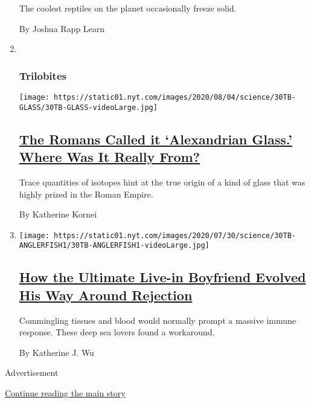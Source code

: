 \begin{enumerate}
  The coolest reptiles on the planet occasionally freeze solid.

  By Joshua Rapp Learn
\item ~
  \hypertarget{trilobites-2}{%
  \subsubsection{Trilobites}\label{trilobites-2}}

  \texttt{[image: https://static01.nyt.com/images/2020/08/04/science/30TB-GLASS/30TB-GLASS-videoLarge.jpg]}

  \hypertarget{the-romans-called-it-alexandrian-glass-where-was-it-really-from}{%
  \subsection{\texorpdfstring{\href{/2020/07/31/science/alexandrian-glass-rome.html}{The
  Romans Called it `Alexandrian Glass.' Where Was It Really
  From?}}{The Romans Called it `Alexandrian Glass.' Where Was It Really From?}}\label{the-romans-called-it-alexandrian-glass-where-was-it-really-from}}

  Trace quantities of isotopes hint at the true origin of a kind of
  glass that was highly prized in the Roman Empire.

  By Katherine Kornei
\item
  \texttt{[image: https://static01.nyt.com/images/2020/07/30/science/30TB-ANGLERFISH1/30TB-ANGLERFISH1-videoLarge.jpg]}

  \hypertarget{how-the-ultimate-live-in-boyfriend-evolved-his-way-around-rejection}{%
  \subsection{\texorpdfstring{\href{/2020/07/30/science/anglerfish-immune-rejection.html}{How
  the Ultimate Live-in Boyfriend Evolved His Way Around
  Rejection}}{How the Ultimate Live-in Boyfriend Evolved His Way Around Rejection}}\label{how-the-ultimate-live-in-boyfriend-evolved-his-way-around-rejection}}

  Commingling tissues and blood would normally prompt a massive immune
  response. These deep sea lovers found a workaround.

  By Katherine J. Wu
\end{enumerate}

Advertisement

\protect\hyperlink{after-mid1}{Continue reading the main story}

